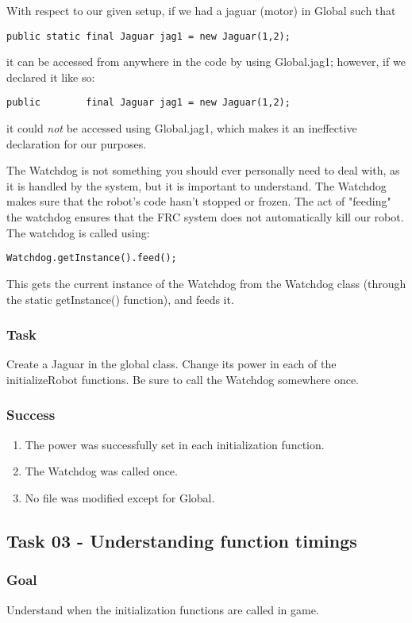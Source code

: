 \documentclass[a4paper]{article}
\begin{document}
With respect to our given setup, if we had a jaguar (motor) in Global such that \begin{verbatim}public static final Jaguar jag1 = new Jaguar(1,2);\end{verbatim}it can be accessed from anywhere in the code by using Global.jag1; however, if we declared it like so:\begin{verbatim}public        final Jaguar jag1 = new Jaguar(1,2);\end{verbatim}

it could \textit{not} be accessed using Global.jag1, which makes it an ineffective declaration for our purposes.

The Watchdog is not something you should ever personally need to deal with, as it is handled by the system, but it is important to understand. The Watchdog makes sure that the robot's code hasn't stopped or frozen. The act of "feeding" the watchdog ensures that the FRC system does not automatically kill our robot. The watchdog is called using:\begin{verbatim}Watchdog.getInstance().feed();\end{verbatim}

This gets the current instance of the Watchdog from the Watchdog class (through the static getInstance() function), and feeds it.
\subsubsection{Task} Create a Jaguar in the global class. Change its power in each of the initializeRobot functions. Be sure to call the Watchdog somewhere once.
\subsubsection{Success} \begin{enumerate}\item{The power was successfully set in each initialization function.}\item{The Watchdog was called once.}\item{No file was modified except for Global.}\end{enumerate}

\subsection{Task 03 - Understanding function timings}
\subsubsection{Goal} Understand when the initialization functions are called in game.
\end{document}
